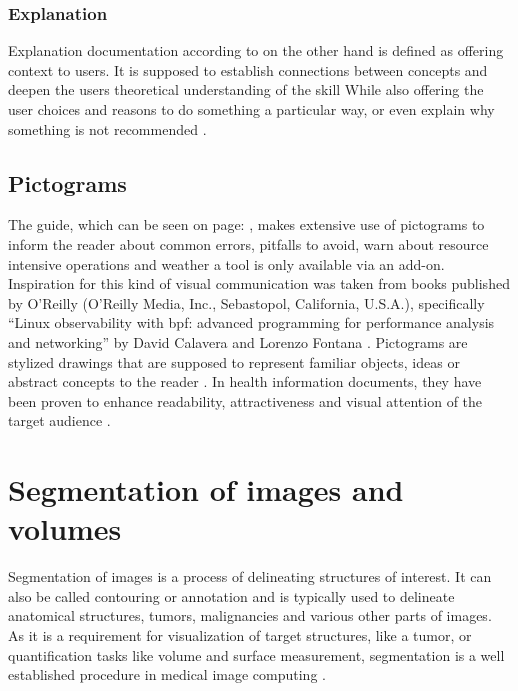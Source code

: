 \subsubsection*{Explanation}
Explanation documentation according to \citeauthor{procidaDiataxisDocumentationFramework2023} on the other hand is defined as offering context to users.
It is supposed to establish connections between concepts and deepen the users theoretical understanding of the skill
While also offering the user choices and reasons to do something a particular way, or even explain why something is not recommended \cite{procidaPythonDocsCommunity2022,procidaDiataxisDocumentationFramework2023}.


\subsection{Pictograms}\label{s:b-pictograms}
The guide, which can be seen on page: \pageref{a:guide}, makes extensive use of pictograms to inform the reader about common errors, pitfalls to avoid, warn about resource intensive operations and weather a tool is only available via an add-on.
Inspiration for this kind of visual communication was taken from books published by O'Reilly (O'Reilly Media, Inc., Sebastopol, California, U.S.A.), specifically ``Linux observability with \acrshort{bpf}: advanced programming for performance analysis and networking'' by David Calavera and Lorenzo Fontana \cite{calaveraLinuxObservabilityBPF2019}.
Pictograms are stylized drawings that are supposed to represent familiar objects, ideas or abstract concepts to the reader \cite{dowsePharmacistsAreWords2021}.
In health information documents, they have been proven to enhance readability, attractiveness and visual attention of the target audience \cite{houtsRolePicturesImproving2006,mansoorEffectPictogramsReadability2003}.\\


\pagebreak
\section{Segmentation of images and volumes}%
Segmentation of images is a process of delineating structures of interest.
It can also be called contouring or annotation and is typically used to delineate anatomical structures, tumors,
malignancies and various other parts of images.
As it is a requirement for visualization of target structures, like a tumor, or quantification tasks like volume and surface measurement,
segmentation is a well established procedure in medical image computing \cite{pinterPolymorphSegmentationRepresentation2019,slicercommunity3DSlicerImage2022}.

